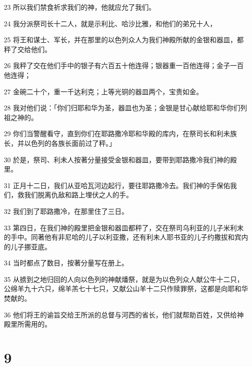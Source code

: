 \par 23 所以我们禁食祈求我们的神，他就应允了我们。
\par 24 我分派祭司长十二人，就是示利比、哈沙比雅，和他们的弟兄十人，
\par 25 将王和谋士、军长，并在那里的以色列众人为我们神殿所献的金银和器皿，都秤了交给他们。
\par 26 我秤了交在他们手中的银子有六百五十他连得；银器重一百他连得；金子一百他连得；
\par 27 金碗二十个，重一千达利克；上等光铜的器皿两个，宝贵如金。
\par 28 我对他们说：「你们归耶和华为圣，器皿也为圣；金银是甘心献给耶和华你们列祖之神的。
\par 29 你们当警醒看守，直到你们在耶路撒冷耶和华殿的库内，在祭司长和利未族长，并以色列的各族长面前过了秤。」
\par 30 於是，祭司、利未人按著分量接受金银和器皿，要带到耶路撒冷我们神的殿里。
\par 31 正月十二日，我们从亚哈瓦河边起行，要往耶路撒冷去。我们神的手保佑我们，救我们脱离仇敌和路上埋伏之人的手。
\par 32 我们到了耶路撒冷，在那里住了三日。
\par 33 第四日，在我们神的殿里把金银和器皿都秤了，交在祭司乌利亚的儿子米利末的手中。同著他有非尼哈的儿子以利亚撒，还有利未人耶书亚的儿子约撒拔和宾内的儿子挪亚底。
\par 34 当时都点了数目，按著分量写在册上。
\par 35 从掳到之地归回的人向以色列的神献燔祭，就是为以色列众人献公牛十二只，公绵羊九十六只，绵羊羔七十七只，又献公山羊十二只作赎罪祭，这都是向耶和华焚献的。
\par 36 他们将王的谕旨交给王所派的总督与河西的省长，他们就帮助百姓，又供给神殿里所需用的。

\chapter{9}

